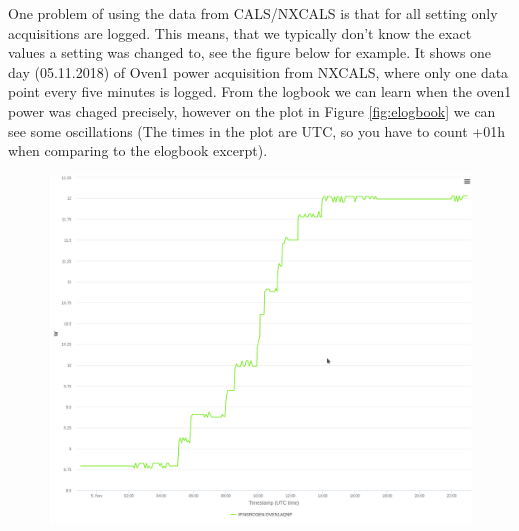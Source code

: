 \documentclass[12pt,a4paper]{article}
\begin{document}
One problem of using the data from CALS/NXCALS is that for all setting only acquisitions are logged. This means, that we typically don't know the exact values a setting was changed to, see the figure below for example. It shows one day (05.11.2018) of Oven1 power acquisition from NXCALS, where only one data point every five minutes is logged. From the logbook we can learn when the oven1 power was chaged precisely, however on the plot in Figure \ref{fig:elogbook} we can see some oscillations (The times in the plot are UTC, so you have to count +01h when comparing to the elogbook excerpt). 


\begin{figure}
\centering
\includegraphics{images/oven1example_05112018.png}

\end{figure}
\end{document}
